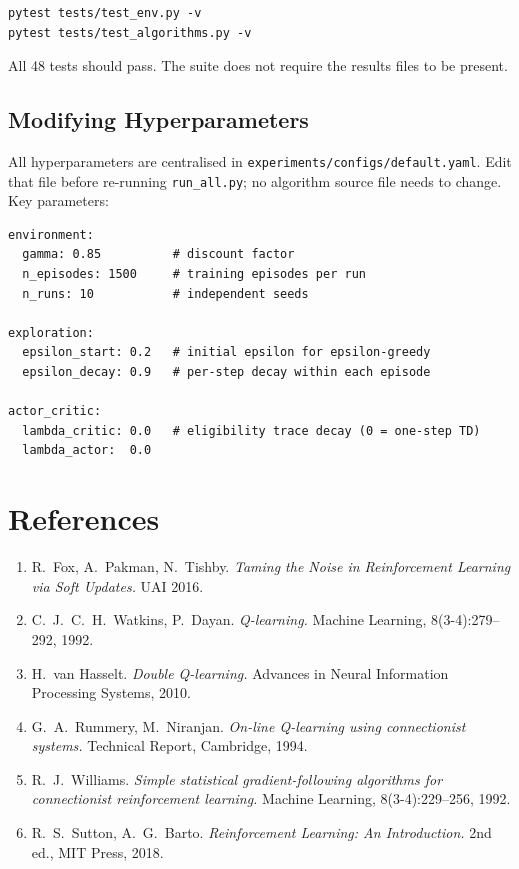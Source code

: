 \documentclass[11pt]{article}
\begin{document}
\begin{verbatim}
pytest tests/test_env.py -v
pytest tests/test_algorithms.py -v
\end{verbatim}

All 48 tests should pass.  The suite does not require the results files to be
present.

\subsection*{Modifying Hyperparameters}

All hyperparameters are centralised in \texttt{experiments/configs/default.yaml}.
Edit that file before re-running \texttt{run\_all.py}; no algorithm source file
needs to change.  Key parameters:

\begin{verbatim}
environment:
  gamma: 0.85          # discount factor
  n_episodes: 1500     # training episodes per run
  n_runs: 10           # independent seeds

exploration:
  epsilon_start: 0.2   # initial epsilon for epsilon-greedy
  epsilon_decay: 0.9   # per-step decay within each episode

actor_critic:
  lambda_critic: 0.0   # eligibility trace decay (0 = one-step TD)
  lambda_actor:  0.0
\end{verbatim}

\section*{References}

\begin{enumerate}[leftmargin=*]
    \item R.\ Fox, A.\ Pakman, N.\ Tishby. \textit{Taming the Noise in
        Reinforcement Learning via Soft Updates.} UAI 2016.

    \item C.\ J.\ C.\ H.\ Watkins, P.\ Dayan. \textit{Q-learning.}
        Machine Learning, 8(3-4):279--292, 1992.

    \item H.\ van Hasselt. \textit{Double Q-learning.}
        Advances in Neural Information Processing Systems, 2010.

    \item G.\ A.\ Rummery, M.\ Niranjan. \textit{On-line Q-learning using
        connectionist systems.} Technical Report, Cambridge, 1994.

    \item R.\ J.\ Williams. \textit{Simple statistical gradient-following
        algorithms for connectionist reinforcement learning.}
        Machine Learning, 8(3-4):229--256, 1992.

    \item R.\ S.\ Sutton, A.\ G.\ Barto. \textit{Reinforcement Learning:
        An Introduction.} 2nd ed., MIT Press, 2018.
\end{enumerate}
\end{document}

